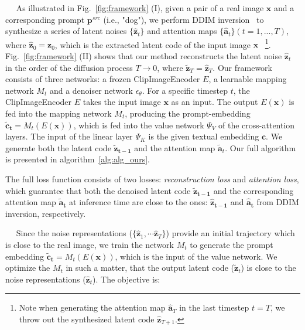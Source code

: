 \documentclass[twocolumn]{svjour3}          \smartqed  \usepackage{graphicx}
\newcommand{\minisection}[1]{\vspace{0.04in} \noindent {\bf #1}\ \ }
\begin{document}
\minisection{Method overview.}
As illustrated in Fig.~\ref{fig:framework} (I),  given a pair of a real image $\mathbf{x}$ and a corresponding prompt $\mathbf{p}^{src}$ (i.e., "dog"),  we  perform DDIM inversion~\citep{dhariwal2021diffusion,song2020denoising} to synthesize a series of latent noises $\{\mathbf{\hat{z}}_t\}$ and attention maps $\{\mathbf{\hat{a}}_t\} (t = 1, ..., T)$, where $\mathbf{\hat{z}}_0 = \mathbf{z}_0$, which is the extracted  latent code of the input image $\mathbf{x}$ ~\footnote{Note  when generating the attention map $\mathbf{\hat{a}}_T$ in the last timestep $t=T$, we throw out the synthesized latent code $\mathbf{\hat{z}}_{T+1}$. }.
Fig.~\ref{fig:framework} (II)   shows that our method reconstructs the latent noise $\mathbf{\hat{z}}_t$ in the order of the diffusion process $T \rightarrow 0$, where $\mathbf{\widetilde{z}}_T=\mathbf{\hat{z}}_T$. Our framework consists of three networks: a frozen ClipImageEncoder $E$,   a learnable mapping network $M_{t}$ and a denoiser network $\epsilon_\theta$.  For a specific timestep $t$, the  ClipImageEncoder $E$ takes the input image $\mathbf{x}$ as an input. The output $E(\mathbf{x})$ is fed into the mapping network $M_{t}$, producing the prompt-embedding $\mathbf{\widetilde {c}_{t}} = M_{t}\left ( E(\mathbf{x}) \right )$, which is fed into the value network $\Psi_V$ of the cross-attention layers. The  input of the linear layer $\Psi_K$ is the given textual embedding $\mathbf{c}$. We generate both the latent code $\mathbf{\widetilde{z}_{t-1}}$ and the attention map $\mathbf{\widetilde{a}}_t$. 
Our full algorithm is presented in algorithm~\ref{alg:alg_ours}.

The full loss function consists of two losses:   \textit{reconstruction loss} and \textit{attention loss}, which   guarantee
that both  the denoised latent code $\mathbf{\widetilde{z}_{t-1}}$ and  the  corresponding attention map $\mathbf{\widetilde{a}_{t}}$  at inference time are close to the ones: $\mathbf{\hat{z}_{t-1}}$ and  $\mathbf{\hat{a}_{t}}$ from DDIM inversion, respectively. 

\minisection{\textit{Reconstruction Loss}.} 
Since the noise representations ($\{\mathbf{\hat{z}}_1, \cdots \mathbf{\hat{z}}_T\}$) provide an initial trajectory which is close to the real image, we train the network $M_{t}$
to generate the prompt embedding $\mathbf{\widetilde {c}_{t}} = M_{t}\left ( E(\mathbf{x}) \right )$, which is the input of the value network. We optimize the $M_{t}$ in such a matter, that the output latent code ($\mathbf{\widetilde{z}}_t$)  is close to the noise representations ($\mathbf{\hat{z}}_t$). The objective is: 
\end{document}
